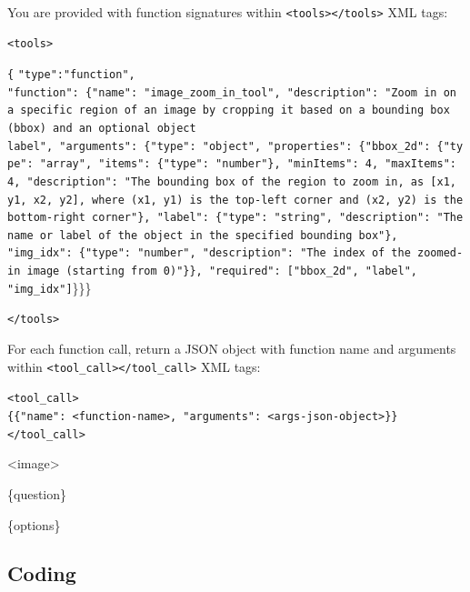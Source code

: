 \begin{tcolorbox}[
  title={HRBench4K | HRBench8K},
  fonttitle=\bfseries,
  colframe=black,
  colback=white,
  toptitle=1mm,
  bottomtitle=1mm,
  top=2mm,
  verbatim,
]
\ 

You are provided with function signatures within \texttt{\textless tools\textgreater}\texttt{\textless /tools\textgreater} XML tags:
\par\noindent\texttt{\textless tools\textgreater}

\texttt{\{}
\texttt{"type":"function",}
\texttt{"function":\ \{"name":\ "image\_zoom\_in\_tool",\ "description":\ "Zoom in on a specific region of an image by cropping it based on a bounding box (bbox) and an optional object label",\ "arguments":\ \{"type":\ "object",\ "properties":\ \{"bbox\_2d":\ \{"type":\ "array",\ "items":\ \{"type":\ "number"\},\ "minItems":\ 4,\ "maxItems":\ 4,\ "description":\ "The bounding\ box\ of\ the\ region to zoom in, as [x1, y1, x2, y2], where (x1, y1) is the top-left corner and (x2, y2) is the bottom-right corner"\}, "label": \{"type": "string", "description": "The name or label of the object in the specified bounding box"\}, "img\_idx": \{"type": "number", "description": "The index of the zoomed-in image (starting from 0)"\}\}, "required": ["bbox\_2d", "label", "img\_idx"]}\}\}\}

\texttt{\textless /tools\textgreater}

For each function call, return a JSON object with function name and arguments within \texttt{\textless tool\_call\textgreater}\texttt{\textless /tool\_call\textgreater} XML tags:
\par\noindent\texttt{\textless tool\_call\textgreater}\\
\texttt{\{\{"name": \textless function-name\textgreater , "arguments": \textless args-json-object\textgreater \}\}}\\
\texttt{\textless /tool\_call\textgreater}

<image>

\{question\}

\{options\}

\end{tcolorbox}


\subsection{Coding}


